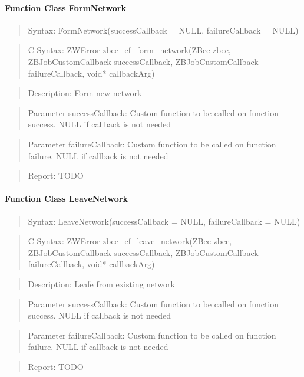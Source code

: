 \paragraph{Function Class FormNetwork}
\begin{quote}Syntax: FormNetwork(successCallback = NULL, failureCallback = NULL)\end{quote}
\begin{quote}C Syntax: ZWError zbee\_ef\_form\_network(ZBee zbee, ZBJobCustomCallback successCallback, ZBJobCustomCallback failureCallback, void* callbackArg)\end{quote}
\begin{quote}Description: Form new network\end{quote}
\begin{quote}Parameter successCallback: Custom function to be called on function success. NULL if callback is not needed\end{quote}
\begin{quote}Parameter failureCallback: Custom function to be called on function failure. NULL if callback is not needed\end{quote}
\begin{quote}Report: TODO\end{quote}

\paragraph{Function Class LeaveNetwork}
\begin{quote}Syntax: LeaveNetwork(successCallback = NULL, failureCallback = NULL)\end{quote}
\begin{quote}C Syntax: ZWError zbee\_ef\_leave\_network(ZBee zbee, ZBJobCustomCallback successCallback, ZBJobCustomCallback failureCallback, void* callbackArg)\end{quote}
\begin{quote}Description: Leafe from existing network\end{quote}
\begin{quote}Parameter successCallback: Custom function to be called on function success. NULL if callback is not needed\end{quote}
\begin{quote}Parameter failureCallback: Custom function to be called on function failure. NULL if callback is not needed\end{quote}
\begin{quote}Report: TODO\end{quote}

